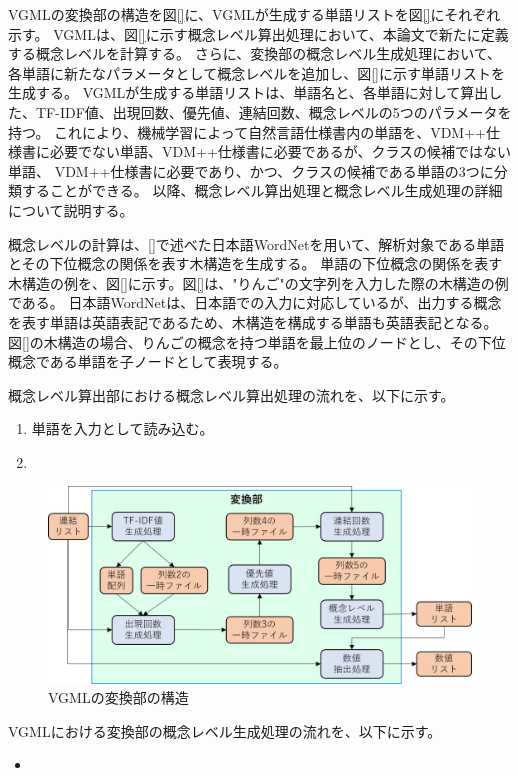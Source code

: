 VGMLの変換部の構造を図\ref{}に、VGMLが生成する単語リストを図\ref{}にそれぞれ示す。
VGMLは、図\ref{}に示す概念レベル算出処理において、本論文で新たに定義する概念レベルを計算する。
さらに、変換部の概念レベル生成処理において、各単語に新たなパラメータとして概念レベルを追加し、図\ref{}に示す単語リストを生成する。
VGMLが生成する単語リストは、単語名と、各単語に対して算出した、TF-IDF値、出現回数、優先値、連結回数、概念レベルの5つのパラメータを持つ。
これにより、機械学習によって自然言語仕様書内の単語を、VDM++仕様書に必要でない単語、VDM++仕様書に必要であるが、クラスの候補ではない単語、
VDM++仕様書に必要であり、かつ、クラスの候補である単語の3つに分類することができる。
以降、概念レベル算出処理と概念レベル生成処理の詳細について説明する。

概念レベルの計算は、\ref{}で述べた日本語WordNetを用いて、解析対象である単語とその下位概念の関係を表す木構造を生成する。
単語の下位概念の関係を表す木構造の例を、図\ref{}に示す。図\ref{}は、"りんご"の文字列を入力した際の木構造の例である。
日本語WordNetは、日本語での入力に対応しているが、出力する概念を表す単語は英語表記であるため、木構造を構成する単語も英語表記となる。
図\ref{}の木構造の場合、りんごの概念を持つ単語を最上位のノードとし、その下位概念である単語を子ノードとして表現する。

概念レベル算出部における概念レベル算出処理の流れを、以下に示す。
\begin{enumerate}
    \item 単語を入力として読み込む。
    \item 
\end{enumerate}


\begin{figure}[t]
    \begin{center}
        \includegraphics[width=1.0\columnwidth]{image/vgml_transfer.png}
        \caption{VGMLの変換部の構造}
        \label{fig:sample}
    \end{center}
\end{figure}

VGMLにおける変換部の概念レベル生成処理の流れを、以下に示す。

\begin{itemize}
    \item 
\end{itemize}
